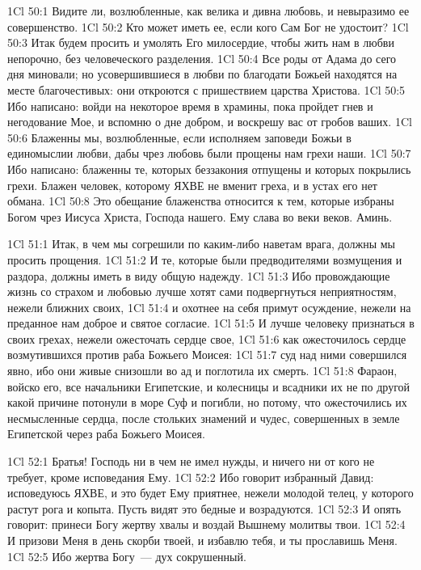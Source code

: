 \vs 1Cl 50:1
Видите ли, возлюбленные,
как велика и дивна любовь, и невыразимо ее совершенство.
\vs 1Cl 50:2
Кто может иметь ее, если
кого Сам Бог не удостоит?
\vs 1Cl 50:3
Итак будем просить и
умолять Его милосердие, чтобы жить нам в любви непорочно, без человеческого
разделения.
\vs 1Cl 50:4
Все роды от Адама до сего
дня миновали; но усовершившиеся в любви по благодати Божьей находятся на месте
благочестивых: они откроются с пришествием царства Христова.
\vs 1Cl 50:5
Ибо написано: войди на
некоторое время в храмины, пока пройдет гнев и негодование Мое, и вспомню о
дне добром, и воскрешу вас от гробов ваших.
\vs 1Cl 50:6
Блаженны мы, возлюбленные,
если исполняем заповеди Божьи в единомыслии любви, дабы чрез любовь были
прощены нам грехи наши.
\vs 1Cl 50:7
Ибо написано: блаженны
те, которых беззакония отпущены и которых покрылись грехи. Блажен человек,
которому ЯХВЕ не вменит греха, и в устах его нет обмана.
\vs 1Cl 50:8
Это обещание блаженства
относится к тем, которые избраны Богом чрез Иисуса Христа, Господа нашего. Ему
слава во веки веков. Аминь.

\vs 1Cl 51:1
Итак, в чем мы согрешили
по каким-либо наветам врага, должны мы просить прощения.
\vs 1Cl 51:2
И те, которые были
предводителями возмущения и раздора, должны иметь в виду общую надежду.
\vs 1Cl 51:3
Ибо провождающие жизнь со
страхом и любовью лучше хотят сами подвергнуться неприятностям, нежели ближних
своих,
\vs 1Cl 51:4
и охотнее на себя примут
осуждение, нежели на преданное нам доброе и святое согласие.
\vs 1Cl 51:5
И лучше человеку
признаться в своих грехах, нежели ожесточать сердце свое,
\vs 1Cl 51:6
как ожесточилось сердце
возмутившихся против раба Божьего Моисея:
\vs 1Cl 51:7
суд над ними совершился
явно, ибо они живые снизошли во ад и поглотила их смерть.
\vs 1Cl 51:8
Фараон, войско его, все
начальники Египетские, и колесницы и всадники их не по другой какой причине
потонули в море Суф и погибли, но потому, что ожесточились их несмысленные
сердца, после стольких знамений и чудес, совершенных в земле Египетской через
раба Божьего Моисея.

\vs 1Cl 52:1
Братья! Господь ни в чем
не имел нужды, и ничего ни от кого не требует, кроме исповедания Ему.
\vs 1Cl 52:2
Ибо говорит избранный
Давид: исповедуюсь ЯХВЕ, и это будет Ему приятнее, нежели молодой телец, у
которого растут рога и копыта. Пусть видят это бедные и возрадуются.
\vs 1Cl 52:3
И опять говорит: принеси
Богу жертву хвалы и воздай Вышнему молитвы твои.
\vs 1Cl 52:4
И призови Меня в день
скорби твоей, и избавлю тебя, и ты прославишь Меня.
\vs 1Cl 52:5
Ибо жертва Богу~--- дух
сокрушенный.

